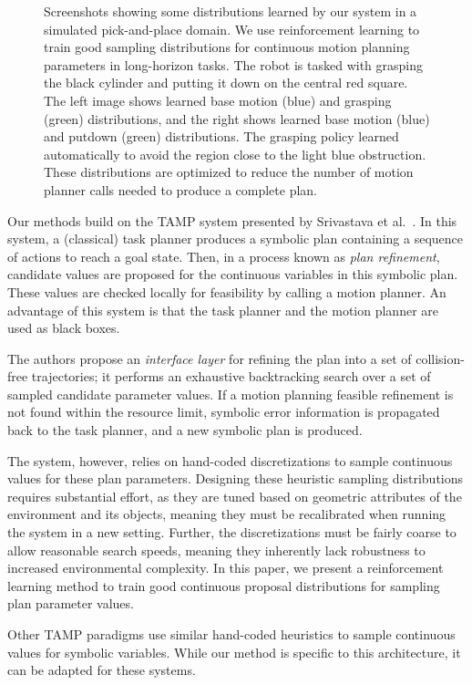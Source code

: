 \begin{figure}[t]
  \caption{Screenshots showing some distributions learned by our system in a simulated pick-and-place
    domain. We use reinforcement learning to train good sampling distributions for continuous motion
    planning parameters in long-horizon tasks. The robot is tasked with grasping the black cylinder and putting it down on the
    central red square. The left image shows learned base motion (blue) and grasping (green) distributions,
    and the right shows learned base motion (blue) and putdown (green) distributions. The grasping policy
    learned automatically to avoid the region close to the light blue obstruction. These distributions are
    optimized to reduce the number of motion planner calls needed to produce a complete plan.}
  \label{fig:cover}
\end{figure}

Our methods build on the TAMP system presented by Srivastava et al.~\cite{srivastava2014combined}.
In this system, a (classical) task planner produces a symbolic plan containing
a sequence of actions to reach a goal state. Then, in a process known as \emph{plan refinement},
candidate values are proposed for the continuous variables in this symbolic plan.
These values are checked locally for feasibility by calling a motion planner.
An advantage of this system is that the task planner and the motion planner are used as black boxes.

The authors propose an \emph{interface layer} for refining the plan into a set
of collision-free trajectories; it performs an exhaustive backtracking search over a
set of sampled candidate parameter values. If a motion planning feasible
refinement is not found within the resource limit, symbolic error information is
propagated back to the task planner, and a new symbolic plan is produced.

The system, however, relies on hand-coded discretizations to sample continuous values for these
plan parameters. Designing these heuristic sampling distributions requires substantial effort,
as they are tuned based on geometric attributes of the environment and its objects, meaning they
must be recalibrated when running the system in a new setting. Further,
the discretizations must be fairly coarse to allow reasonable search speeds, meaning they inherently lack
robustness to increased environmental complexity. In this paper, we present a reinforcement
learning method to train good continuous proposal distributions for sampling plan parameter values.

Other TAMP paradigms use similar hand-coded heuristics to sample continuous values for symbolic variables.
While our method is specific to this architecture, it can be adapted for these systems.

